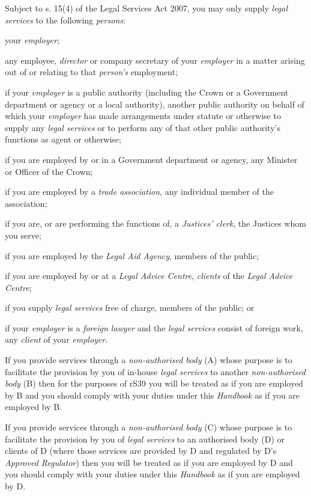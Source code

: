 Subject to s. 15(4) of the Legal Services Act 2007, you may only supply
\emph{legal services} to the following \emph{persons}:\nl\item your \emph{employer};
\item any employee, \emph{director} or company secretary of your
\emph{employer} in a matter arising out of or relating to that
\emph{person's} employment;
\item if your \emph{employer} is a public authority (including the Crown or
a Government department or agency or a local authority), another public
authority on behalf of which your \emph{employer} has made arrangements
under statute or otherwise to supply any \emph{legal services} or to
perform any of that other public authority's functions as agent or
otherwise;
\item if you are employed by or in a Government department or agency, any
Minister or Officer of the Crown;
\item if you are employed by a \emph{trade association}, any individual
member of the association;
\item if you are, or are performing the functions of, a \emph{Justices'
clerk}, the Justices whom you serve;
\item if you are employed by the \emph{Legal Aid Agency}, members of the
public;
\item if you are employed by or at a \emph{Legal Advice Centre},
\emph{clients} of the \emph{Legal Advice Centre};
\item if you supply \emph{legal services} free of charge, members of the
public; or
\item if your \emph{employer} is a \emph{foreign lawyer} and the
\emph{legal services} consist of foreign work, any \emph{client} of your
\emph{employer}.
\ln




If you provide services through a \emph{non-authorised body} (A) whose
purpose is to facilitate the provision by you of in-house \emph{legal
services} to another \emph{non-authorised body} (B) then for the
purposes of rS39 you will be treated as if you are employed by B and you
should comply with your duties under this \emph{Handbook} as if you are
employed by B.


If you provide services through a \emph{non-authorised body} (C) whose
purpose is to facilitate the provision by you of \emph{legal services}
to an authorised body (D) or clients of D (where those services are
provided by D and regulated by D's \emph{Approved Regulator}) then you
will be treated as if you are employed by D and you should comply with
your duties under this \emph{Handbook} as if you are employed by D.

